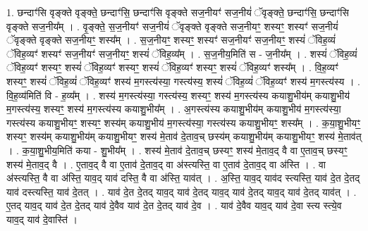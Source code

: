 \documentclass[17pt]{extarticle}
\begin{document}
1. छन्दाꣳ॑सि वृङ्क्ते वृङ्क्ते॒ छन्दाꣳ॑सि॒ छन्दाꣳ॑सि वृङ्क्ते सज॒नीयꣳ॑ सज॒नीयं॑ ॅवृङ्क्ते॒ छन्दाꣳ॑सि॒ छन्दाꣳ॑सि वृङ्क्ते सज॒नीय᳚म् । . वृ॒ङ्क्ते॒ स॒ज॒नीयꣳ॑ सज॒नीयं॑ ॅवृङ्क्ते वृङ्क्ते सज॒नीयꣳ॒॒ शस्यꣳ॒॒ शस्यꣳ॑ सज॒नीयं॑ ॅवृङ्क्ते वृङ्क्ते सज॒नीयꣳ॒॒ शस्य᳚म् । . स॒ज॒नीयꣳ॒॒ शस्यꣳ॒॒ शस्यꣳ॑ सज॒नीयꣳ॑ सज॒नीयꣳ॒॒ शस्यं॑ ॅविह॒व्यं॑ ॅविह॒व्यꣳ॑ शस्यꣳ॑ सज॒नीयꣳ॑ सज॒नीयꣳ॒॒ शस्यं॑ ॅविह॒व्य᳚म् । . स॒ज॒नीय॒मिति॑ स - ज॒नीय᳚म् । . शस्यं॑ ॅविह॒व्यं॑ ॅविह॒व्यꣳ॑ शस्यꣳ॒॒ शस्यं॑ ॅविह॒व्यꣳ॑ शस्यꣳ॒॒ शस्यं॑ ॅविह॒व्यꣳ॑ शस्यꣳ॒॒ शस्यं॑ ॅविह॒व्यꣳ॑ शस्य᳚म् । . वि॒ह॒व्यꣳ॑ शस्यꣳ॒॒ शस्यं॑ ॅविह॒व्यं॑ ॅविह॒व्यꣳ॑ शस्य॑ म॒गस्त्य॑स्या॒ गस्त्य॑स्य॒ शस्यं॑ ॅविह॒व्यं॑ ॅविह॒व्यꣳ॑ शस्य॑ म॒गस्त्य॑स्य । . वि॒ह॒व्य॑मिति॑ वि - ह॒व्य᳚म् । . शस्य॑ म॒गस्त्य॑स्या॒ गस्त्य॑स्य॒ शस्यꣳ॒॒ शस्य॑ म॒गस्त्य॑स्य कयाशु॒भीय॑म् कयाशु॒भीय॑ म॒गस्त्य॑स्य॒ शस्यꣳ॒॒ शस्य॑ म॒गस्त्य॑स्य कयाशु॒भीय᳚म् । . अ॒गस्त्य॑स्य कयाशु॒भीय॑म् कयाशु॒भीय॑ म॒गस्त्य॑स्या॒ गस्त्य॑स्य कयाशु॒भीयꣳ॒॒ शस्यꣳ॒॒ शस्य॑म् कयाशु॒भीय॑ म॒गस्त्य॑स्या॒ गस्त्य॑स्य कयाशु॒भीयꣳ॒॒ शस्य᳚म् । . क॒या॒शु॒भीयꣳ॒॒ शस्यꣳ॒॒ शस्य॑म् कयाशु॒भीय॑म् कयाशु॒भीयꣳ॒॒ शस्य॑ मे॒ताव॑ दे॒ताव॒च् छस्य॑म् कयाशु॒भीय॑म् कयाशु॒भीयꣳ॒॒ शस्य॑ मे॒ताव॑त् । . क॒या॒शु॒भीय॒मिति॑ कया - शु॒भीय᳚म् । . शस्य॑ मे॒ताव॑ दे॒ताव॒च् छस्यꣳ॒॒ शस्य॑ मे॒ताव॒द् वै वा ए॒ताव॒च् छस्यꣳ॒॒ शस्य॑ मे॒ताव॒द् वै । . ए॒ताव॒द् वै वा ए॒ताव॑ दे॒ताव॒द् वा अ॑स्त्यस्ति॒ वा ए॒ताव॑ दे॒ताव॒द् वा अ॑स्ति । . वा अ॑स्त्यस्ति॒ वै वा अ॑स्ति॒ याव॒द् याव॑ दस्ति॒ वै वा अ॑स्ति॒ याव॑त् । . अ॒स्ति॒ याव॒द् याव॑द स्त्यस्ति॒ याव॑ दे॒त दे॒तद् याव॑ दस्त्यस्ति॒ याव॑ दे॒तत् । . याव॑ दे॒त दे॒तद् याव॒द् याव॑ दे॒तद् याव॒द् याव॑ दे॒तद् याव॒द् याव॑ दे॒तद् याव॑त् । . ए॒तद् याव॒द् याव॑ दे॒त दे॒तद् याव॑ दे॒वैव याव॑ दे॒त दे॒तद् याव॑ दे॒व । . याव॑ दे॒वैव याव॒द् याव॑ दे॒वा स्त्य स्त्ये॒व याव॒द् याव॑ दे॒वास्ति॑ । \newline
\end{document}
